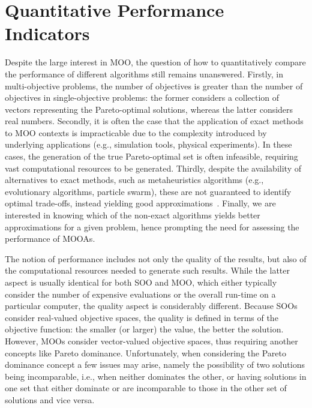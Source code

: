 \section{Quantitative Performance Indicators}

Despite the large interest in \ac{MOO}, the question of how to quantitatively compare the performance of different algorithms still remains unanswered. Firstly, in multi-objective problems, the number of objectives is greater than the number of objectives in single-objective problems: the former considers a collection of vectors representing the Pareto-optimal solutions, whereas the latter considers real numbers. Secondly, it is often the case that the application of exact methods to \ac{MOO} contexts is impracticable due to the complexity introduced by underlying applications (e.g., simulation tools, physical experiments). In these cases, the generation of the true Pareto-optimal set is often infeasible, requiring vast computational resources to be generated. Thirdly, despite the availability of alternatives to exact methods, such as metaheuristics algorithms (e.g., evolutionary algorithms, particle swarm), these are not guaranteed to identify optimal trade-offs, instead yielding good approximations~\cite{Zitzler2003Metrics}. Finally, we are interested in knowing which of the non-exact algorithms yields better approximations for a given problem, hence prompting the need for assessing the performance of \acp{MOOA}.

The notion of performance includes not only the quality of the results, but also of the computational resources needed to generate such results. While the latter aspect is usually identical for both \ac{SOO} and \ac{MOO}, which either typically consider the number of expensive evaluations or the overall run-time on a particular computer, the quality aspect is considerably different. Because \acp{SOO} consider real-valued objective spaces, the quality is defined in terms of the objective function: the smaller (or larger) the value, the better the solution. However, \acp{MOO} consider vector-valued objective spaces, thus requiring another concepts like Pareto dominance. Unfortunately, when considering the Pareto dominance concept a few issues may arise, namely the possibility of two solutions being incomparable, i.e., when neither dominates the other, or having solutions in one set that either dominate or are incomparable to those in the other set of solutions and vice versa. 

